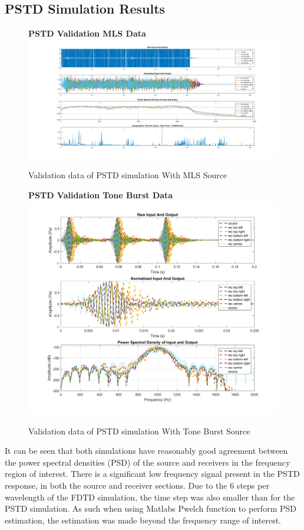 \subsection{PSTD Simulation Results}
\begin{figure}[H]
\centering
\textbf{PSTD Validation MLS Data}
  \includegraphics[width=\textwidth]{./graphics/PSTDvalidationFinal.png}
  \caption{Validation data of PSTD simulation With MLS Source}
  \textbf{PSTD Validation Tone Burst Data}
  \includegraphics[width=\textwidth]{./graphics/PSTDvalidationFinalTB.png}
  \caption{Validation data of PSTD simulation With Tone Burst Source}
\end{figure}

It can be seen that both simulations have reasonably good agreement between the power spectral densities (PSD) of the source and receivers in the frequency region of interest. There is a significant low frequency signal present in the PSTD response, in both the source and receiver sections.  Due to the 6 steps per wavelength of the FDTD simulation, the time step was also smaller than for the PSTD simulation. As such when using Matlabs Pwelch function to perform PSD estimation, the estimation was made beyond the frequency range of interest.\\


